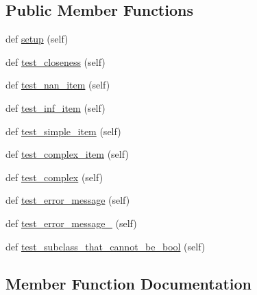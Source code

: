 \subsection*{Public Member Functions}
\begin{DoxyCompactItemize}
\item 
def \hyperlink{classnumpy_1_1testing_1_1tests_1_1test__utils_1_1TestAlmostEqual_adc30b1d96bd108f5ded06d15be0d2df0}{setup} (self)
\item 
def \hyperlink{classnumpy_1_1testing_1_1tests_1_1test__utils_1_1TestAlmostEqual_a617ba5af901642ad2d04f6cad5e4072e}{test\+\_\+closeness} (self)
\item 
def \hyperlink{classnumpy_1_1testing_1_1tests_1_1test__utils_1_1TestAlmostEqual_a79172cddefdbdeeb54ff01a592ec6b95}{test\+\_\+nan\+\_\+item} (self)
\item 
def \hyperlink{classnumpy_1_1testing_1_1tests_1_1test__utils_1_1TestAlmostEqual_ad4191b1bf5f40eea1025be9b729145b1}{test\+\_\+inf\+\_\+item} (self)
\item 
def \hyperlink{classnumpy_1_1testing_1_1tests_1_1test__utils_1_1TestAlmostEqual_a510f7dd979fdebf334dbfc81c4bd9b8f}{test\+\_\+simple\+\_\+item} (self)
\item 
def \hyperlink{classnumpy_1_1testing_1_1tests_1_1test__utils_1_1TestAlmostEqual_ac5d1a83b6c7cf4e0b9fa461f94b1e3e6}{test\+\_\+complex\+\_\+item} (self)
\item 
def \hyperlink{classnumpy_1_1testing_1_1tests_1_1test__utils_1_1TestAlmostEqual_a56aa2dd146356804d90283a73ec9f862}{test\+\_\+complex} (self)
\item 
def \hyperlink{classnumpy_1_1testing_1_1tests_1_1test__utils_1_1TestAlmostEqual_ad3840fc1b9159b6762de16d999099b82}{test\+\_\+error\+\_\+message} (self)
\item 
def \hyperlink{classnumpy_1_1testing_1_1tests_1_1test__utils_1_1TestAlmostEqual_ac114da159439f02e4a744e7f8803eccf}{test\+\_\+error\+\_\+message\+\_} (self)
\item 
def \hyperlink{classnumpy_1_1testing_1_1tests_1_1test__utils_1_1TestAlmostEqual_a5d5a57de4e145e3a91f3d94c01b70396}{test\+\_\+subclass\+\_\+that\+\_\+cannot\+\_\+be\+\_\+bool} (self)
\end{DoxyCompactItemize}


\subsection{Member Function Documentation}
\mbox{\label{classnumpy_1_1testing_1_1tests_1_1test__utils_1_1TestAlmostEqual_adc30b1d96bd108f5ded06d15be0d2df0}} 
